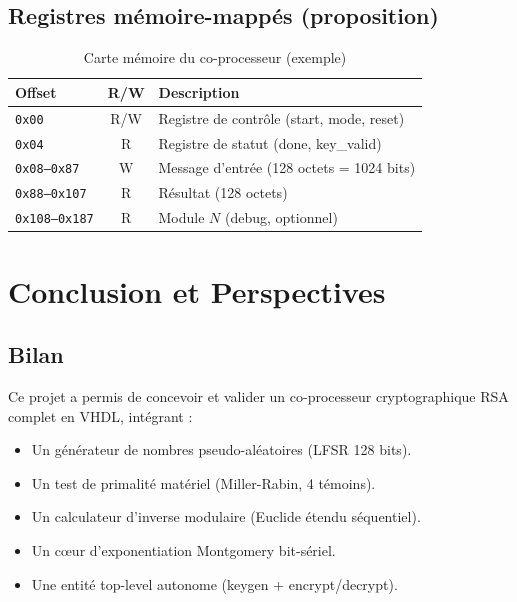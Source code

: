 \documentclass[12pt,a4paper]{report}
\begin{document}
\subsection{Registres mémoire-mappés (proposition)}

\begin{table}[H]
\centering
\caption{Carte mémoire du co-processeur (exemple)}
\begin{tabular}{lcp{6cm}}
\toprule
\textbf{Offset} & \textbf{R/W} & \textbf{Description} \\
\midrule
\texttt{0x00} & R/W & Registre de contrôle (start, mode, reset) \\
\texttt{0x04} & R   & Registre de statut (done, key\_valid) \\
\texttt{0x08--0x87} & W & Message d'entrée (128 octets = 1024 bits) \\
\texttt{0x88--0x107} & R & Résultat (128 octets) \\
\texttt{0x108--0x187} & R & Module $N$ (debug, optionnel) \\
\bottomrule
\end{tabular}
\end{table}

\section{Conclusion et Perspectives}
\label{ch:conclusion}

\subsection{Bilan}
Ce projet a permis de concevoir et valider un co-processeur cryptographique
RSA complet en VHDL, intégrant :
\begin{itemize}
  \item Un générateur de nombres pseudo-aléatoires (LFSR 128 bits).
  \item Un test de primalité matériel (Miller-Rabin, 4 témoins).
  \item Un calculateur d'inverse modulaire (Euclide étendu séquentiel).
  \item Un cœur d'exponentiation Montgomery bit-sériel.
  \item Une entité top-level autonome (keygen + encrypt/decrypt).
\end{itemize}
\end{document}
